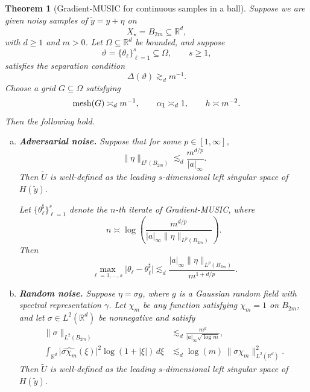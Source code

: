 \documentclass[11pt]{article}
\newtheorem{theorem}{Theorem}
\theoremstyle{definition}
\numberwithin{theorem}{section}
\numberwithin{lemma}{section}
\numberwithin{equation}{section}
\def\R{\mathbb{R}}
\renewcommand{\subset}{\subseteq}
\renewcommand{\tilde}{\widetilde}
\newcommand{\mesh}{{\rm mesh}}
\newcommand{\sampset}{X}
\newcommand{\bfa}{a}
\numberwithin{equation}{section}
\begin{document}
\begin{theorem}[Gradient-MUSIC for continuous samples in a ball]
\label{thm:mainball}
Suppose we are given noisy samples of $\tilde y=y+\eta$ on
\[
\sampset_\star=B_{2m}\subset \R^d,
\]
with $d\ge 1$ and $m>0$. Let $\Omega\subset \R^d$ be bounded, and suppose
\[
\vartheta=\{\theta_\ell\}_{\ell=1}^s\subset \Omega,
\qquad s\ge 1,
\]
satisfies the separation condition
\[
\Delta(\vartheta)\gtrsim_d m^{-1}.
\]
Choose a grid $G\subset \Omega$ satisfying
\[
\mesh(G)\asymp_d m^{-1},
\qquad
\alpha_1\asymp_d 1,
\qquad
h\asymp m^{-2}.
\]
Then the following hold.

\begin{enumerate}[(a)]
\item \textbf{Adversarial noise.}
Suppose that for some $p\in[1,\infty]$,
\begin{equation}
\label{eq:etacondball}
\|\eta\|_{L^p(B_{2m})}
\lesssim_d \frac{m^{d/p}}{|\bfa|_\infty}.
\end{equation}
Then $\tilde U$ is well-defined as the leading $s$-dimensional left singular space of $H(\tilde y)$.

Let $\{\theta_\ell^\sharp\}_{\ell=1}^s$ denote the $n$-th iterate of Gradient-MUSIC, where
\begin{equation}
\label{eq:ngraditerball1}
n\asymp
\log\!\left(
\frac{m^{d/p}}{|\bfa|_\infty \|\eta\|_{L^p(B_{2m})}}
\right).
\end{equation}
Then
\begin{equation}
\label{eq:ballcasea}
\max_{\ell=1,\dots,s}
\bigl|\theta_\ell-\theta_\ell^\sharp\bigr|
\lesssim_d
\frac{|\bfa|_\infty \|\eta\|_{L^p(B_{2m})}}{m^{1+d/p}}.
\end{equation}

\item \textbf{Random noise.}
Suppose $\eta=\sigma g$, where $g$ is a Gaussian random field with spectral representation $\gamma$. Let $\chi_m$ be any function satisfying $\chi_m=1$ on $B_{2m}$, and let $\sigma\in L^2(\R^d)$ be nonnegative and satisfy
\begin{align}
\|\sigma\|_{L^2(B_{2m})}
&\lesssim_d
\frac{m^d}{|\bfa|_\infty\sqrt{\log m}},
\label{eq:sigmasizecondball}
\\
\int_{\R^d}
\bigl|\widehat{\sigma\chi_m}(\xi)\bigr|^2
\log(1+|\xi|)\,d\xi
&\lesssim_d
\log(m)\,\|\sigma\chi_m\|_{L^2(\R^d)}^2.
\label{eq:sigmasizecondball2}
\end{align}
Then $\tilde U$ is well-defined as the leading $s$-dimensional left singular space of $H(\tilde y)$.


\end{enumerate}
\end{theorem}
\end{document}

